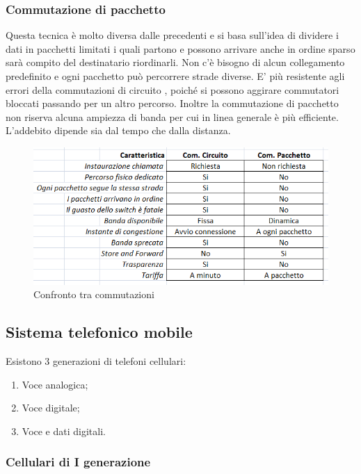 \subsubsection*{Commutazione di pacchetto}

Questa tecnica è molto diversa dalle precedenti e si basa sull'idea di dividere i dati in pacchetti limitati i quali partono e possono arrivare anche in ordine sparso sarà compito del destinatario riordinarli. Non c'è bisogno di alcun collegamento predefinito e ogni pacchetto può percorrere strade diverse. E' più resistente agli errori della commutazioni di circuito , poiché si possono aggirare commutatori bloccati passando per un altro percorso. Inoltre la commutazione di pacchetto non riserva alcuna ampiezza di banda per cui in linea generale è più efficiente. L'addebito dipende sia dal tempo che dalla distanza.

\begin{figure}[htbp]
\centering
\includegraphics[scale=0.8]{images/comm.png}
\caption{Confronto tra commutazioni}
\end{figure}

\subsection{Sistema telefonico mobile}

Esistono 3 generazioni di telefoni cellulari:

\begin{enumerate}

\item{Voce analogica};
\item{Voce digitale};
\item{Voce e dati digitali}.

\end{enumerate}

\subsubsection{Cellulari di I generazione}

